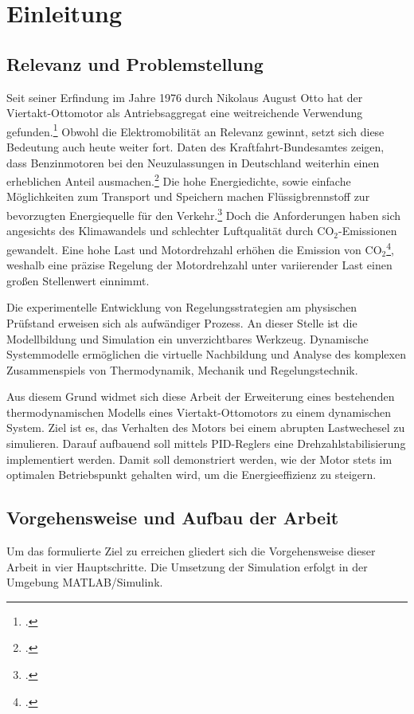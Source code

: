 \section{Einleitung}

\subsection{Relevanz und Problemstellung}
Seit seiner Erfindung im Jahre 1976 durch Nikolaus August Otto hat der Viertakt-Ottomotor als Antriebsaggregat eine weitreichende Verwendung gefunden.\footcite[Vgl.][1]{merker2019} 
Obwohl die Elektromobilität an Relevanz gewinnt, setzt sich diese Bedeutung auch heute weiter fort.
Daten des Kraftfahrt-Bundesamtes zeigen, dass Benzinmotoren bei den Neuzulassungen in Deutschland weiterhin einen erheblichen Anteil ausmachen.\footcite[Vgl.][]{kba2025}
Die hohe Energiedichte, sowie einfache Möglichkeiten zum Transport und Speichern machen Flüssigbrennstoff zur bevorzugten Energiequelle für den Verkehr.\footcite[Vgl.][2]{leach2020}
Doch die Anforderungen haben sich angesichts des Klimawandels und schlechter Luftqualität durch $\text{CO}_2$-Emissionen gewandelt.
Eine hohe Last und Motordrehzahl erhöhen die Emission von $\text{CO}_2$\footcite[Vgl.][6]{shahad2015}, weshalb eine präzise Regelung der Motordrehzahl unter variierender Last einen großen Stellenwert einnimmt.

Die experimentelle Entwicklung von Regelungsstrategien am physischen Prüfstand erweisen sich als aufwändiger Prozess.
An dieser Stelle ist die Modellbildung und Simulation ein unverzichtbares Werkzeug.
Dynamische Systemmodelle ermöglichen die virtuelle Nachbildung und Analyse des komplexen Zusammenspiels von Thermodynamik, Mechanik und Regelungstechnik.

Aus diesem Grund widmet sich diese Arbeit der Erweiterung eines bestehenden thermodynamischen Modells eines Viertakt-Ottomotors zu einem dynamischen System.
Ziel ist es, das Verhalten des Motors bei einem abrupten Lastwechesel zu simulieren.
Darauf aufbauend soll mittels PID-Reglers eine Drehzahlstabilisierung implementiert werden.
Damit soll demonstriert werden, wie der Motor stets im optimalen Betriebspunkt gehalten wird, um die Energieeffizienz zu steigern.

\subsection{Vorgehensweise und Aufbau der Arbeit}
Um das formulierte Ziel zu erreichen gliedert sich die Vorgehensweise dieser Arbeit in vier Hauptschritte.
Die Umsetzung der Simulation erfolgt in der Umgebung MATLAB/Simulink.

